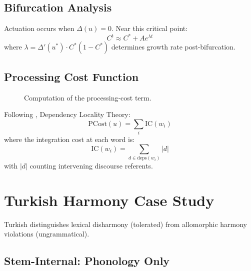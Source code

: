 \documentclass[12pt]{article}
\begin{document}
\subsection{Bifurcation Analysis}

Actuation occurs when $\Delta(u) = 0$. Near this critical point:
\[
C^t \approx C^* + A e^{\lambda t}
\]
where $\lambda = \Delta'(u^*) \cdot C^*(1-C^*)$ determines growth rate post-bifurcation.

\subsection{Processing Cost Function}

\begin{figure}[h]
\centering
{}
\caption{Computation of the processing‑cost term.\label{fig:proc-cost}}
\end{figure}
Following \textcite{gibson2000}, Dependency Locality Theory:
\[
\text{PCost}(u) = \sum_{i} \text{IC}(w_i)
\]
where the integration cost at each word is:
\[
\text{IC}(w_i) = \sum_{d \in \text{deps}(w_i)} |d|
\]
with $|d|$ counting intervening discourse referents.

\section{Turkish Harmony Case Study}

Turkish distinguishes lexical disharmony (tolerated) from allomorphic harmony violations (ungrammatical).

\subsection{Stem-Internal: Phonology Only}
\end{document}
